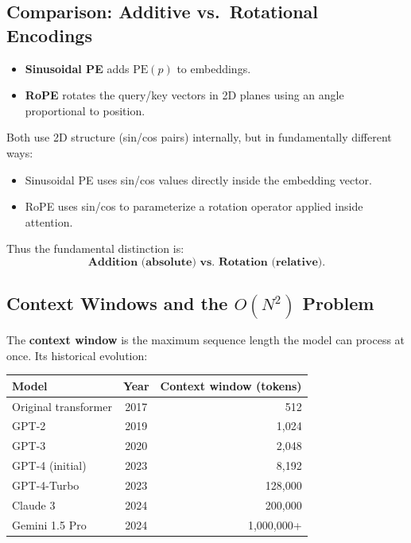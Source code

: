 \documentclass[11pt]{article}
\theoremstyle{remark}
\begin{document}
\subsection{Comparison: Additive vs.\ Rotational Encodings}

\begin{itemize}[noitemsep]
    \item \textbf{Sinusoidal PE} adds $\text{PE}(p)$ to embeddings.
    \item \textbf{RoPE} rotates the query/key vectors in 2D planes using an angle proportional to position.
\end{itemize}
Both use 2D structure (sin/cos pairs) internally, but in fundamentally different ways:
\begin{itemize}[noitemsep]
    \item Sinusoidal PE uses sin/cos values directly inside the embedding vector.
    \item RoPE uses sin/cos to parameterize a rotation operator applied inside attention.
\end{itemize}
Thus the fundamental distinction is:
\[
\textbf{Addition (absolute) vs.\ Rotation (relative).}
\]

\subsection{Context Windows and the \texorpdfstring{\(O(N^2)\)}{O(N\textasciicircum 2)} Problem}

The \textbf{context window} is the maximum sequence length the model can process at once. Its historical evolution:

\begin{center}
\begin{tabular}{@{}lcr@{}}
\toprule
Model & Year & Context window (tokens) \\
\midrule
Original transformer & 2017 & 512 \\
GPT-2 & 2019 & 1,024 \\
GPT-3 & 2020 & 2,048 \\
GPT-4 (initial) & 2023 & 8,192 \\
GPT-4-Turbo & 2023 & 128,000 \\
Claude 3 & 2024 & 200,000 \\
Gemini 1.5 Pro & 2024 & 1,000,000+ \\
\bottomrule
\end{tabular}
\end{center}
\end{document}
